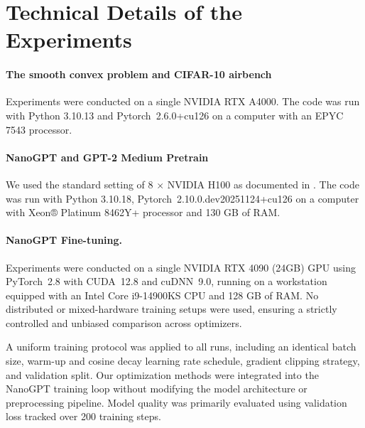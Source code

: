 \documentclass[pmlr]{jmlr}%
\begin{document}
 \section{Technical Details of the Experiments}
 
 \paragraph{The smooth convex problem and CIFAR-10 airbench} Experiments were conducted on a single NVIDIA RTX A4000. The code was run with Python 3.10.13 and Pytorch~2.6.0+cu126 on a computer with an EPYC 7543 processor.
 
 \paragraph{NanoGPT and GPT-2 Medium Pretrain} We used the standard setting of 8 $\times$ NVIDIA H100 as documented in \citep{modded_nanogpt_2024}. The code was run with Python 3.10.18, Pytorch~2.10.0.dev20251124+cu126 on a computer with Xeon® Platinum 8462Y+ processor and 130 GB of RAM.
 
 \paragraph{NanoGPT Fine-tuning.} Experiments were conducted on a single NVIDIA RTX 4090 (24GB) GPU using PyTorch~2.8 with CUDA~12.8 and cuDNN~9.0, running on a workstation equipped with an Intel Core i9-14900KS CPU and 128 GB of RAM. No distributed or mixed-hardware training setups were used, ensuring a strictly controlled and unbiased comparison across optimizers.
 
 A uniform training protocol was applied to all runs, including an identical batch size, warm-up and cosine decay learning rate schedule, gradient clipping strategy, and validation split. Our optimization methods were integrated into the NanoGPT training loop without modifying the model architecture or preprocessing pipeline. Model quality was primarily evaluated using validation loss tracked over 200 training steps.
 
 
\end{document}
